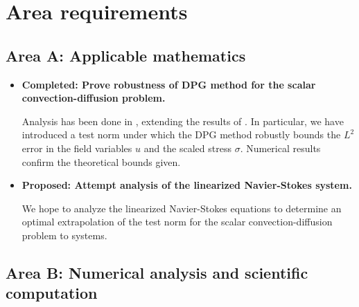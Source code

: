 \section{Area requirements}

\subsection{Area A: Applicable mathematics}

\begin{itemize}
\item{\textbf{Completed: Prove robustness of DPG method for the scalar convection-diffusion problem.}}

Analysis has been done in \cite{DPGrobustness2}, extending the results of \cite{DPGrobustness}. In particular, we have introduced a test norm under which the DPG method robustly bounds the $L^2$ error in the field variables $u$ and the scaled stress $\sigma$. Numerical results confirm the theoretical bounds given. 

\item{\textbf{Proposed: Attempt analysis of the linearized Navier-Stokes system.}}

We hope to analyze the linearized Navier-Stokes equations to determine an optimal extrapolation of the test norm for the scalar convection-diffusion problem to systems. 

\end{itemize}

\subsection{Area B: Numerical analysis and scientific computation}

